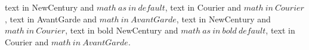 \documentclass{article}
\begin{document}
\testfileincipit

text in NewCentury and $math\ as\ in\ default$,%
 text in Courier and $math\ in\ Courier$,%
 text in AvantGarde and $math\ in\ AvantGarde$,%
 text in NewCentury and $math\ in\
Courier$, text in bold NewCentury and $math\ as\ in\
bold\ default$, text in Courier and
$math\ in\ AvantGarde$.
\end{document}
